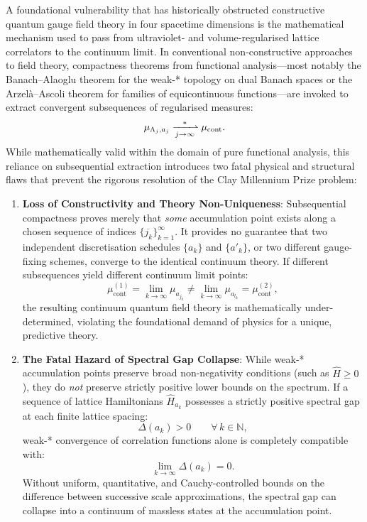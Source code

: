 A foundational vulnerability that has historically obstructed constructive quantum gauge field theory in four spacetime dimensions is the mathematical mechanism used to pass from ultraviolet- and volume-regularised lattice correlators to the continuum limit. In conventional non-constructive approaches to field theory, compactness theorems from functional analysis—most notably the Banach--Alaoglu theorem for the weak-* topology on dual Banach spaces or the Arzel\`a--Ascoli theorem for families of equicontinuous functions—are invoked to extract convergent subsequences of regularised measures:
\begin{equation}
\mu_{\Lambda_j, a_j} \xrightharpoonup[j \to \infty]{*} \mu_{\mathrm{cont}}.
\end{equation}
While mathematically valid within the domain of pure functional analysis, this reliance on subsequential extraction introduces two fatal physical and structural flaws that prevent the rigorous resolution of the Clay Millennium Prize problem:
\begin{enumerate}[label=(\roman*)]
    \item \textbf{Loss of Constructivity and Theory Non-Uniqueness}: Subsequential compactness proves merely that \emph{some} accumulation point exists along a chosen sequence of indices $\{j_k\}_{k=1}^\infty$. It provides no guarantee that two independent discretisation schedules $\{a_k\}$ and $\{a'_k\}$, or two different gauge-fixing schemes, converge to the identical continuum theory. If different subsequences yield different continuum limit points:
    \begin{equation}
    \mu_{\mathrm{cont}}^{(1)} = \lim_{k \to \infty} \mu_{a_{j_k}} \neq \lim_{k \to \infty} \mu_{a_{l_k}} = \mu_{\mathrm{cont}}^{(2)},
    \end{equation}
    the resulting continuum quantum field theory is mathematically under-determined, violating the foundational demand of physics for a unique, predictive theory.

    \item \textbf{The Fatal Hazard of Spectral Gap Collapse}: While weak-* accumulation points preserve broad non-negativity conditions (such as $\hat{H} \ge 0$), they do \emph{not} preserve strictly positive lower bounds on the spectrum. If a sequence of lattice Hamiltonians $\hat{H}_{a_k}$ possesses a strictly positive spectral gap at each finite lattice spacing:
    \begin{equation}
    \Delta(a_k) > 0 \qquad \forall \, k \in \mathbb{N},
    \end{equation}
    weak-* convergence of correlation functions alone is completely compatible with:
    \begin{equation}
    \lim_{k \to \infty} \Delta(a_k) = 0.
    \end{equation}
    Without uniform, quantitative, and Cauchy-controlled bounds on the difference between successive scale approximations, the spectral gap can collapse into a continuum of massless states at the accumulation point.
\end{enumerate}

